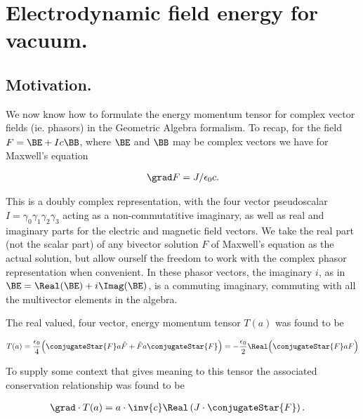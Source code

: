 

\chapter{Electrodynamic field energy for vacuum.}
\label{chap:fourierMaxVac}
{}
\date{Dec 16, 2009}

\beginArtWithToc

\section{Motivation.}

We now know how to formulate the energy momentum tensor for complex vector fields (ie. phasors) in the Geometric Algebra formalism.  To recap, for the field $F = \BE + I c \BB$, where $\BE$ and $\BB$ may be complex vectors we have for Maxwell's equation

\begin{align}\label{eqn:fourierMaxVac:1}
\grad F = J/\epsilon_0 c.
\end{align}

This is a doubly complex representation, with the four vector pseudoscalar $I = \gamma_0 \gamma_1 \gamma_2 \gamma_3$ acting as a non-commutatitive imaginary, as well as real and imaginary parts for the electric and magnetic field vectors.  We take the real part (not the scalar part) of any bivector solution $F$ of Maxwell's equation as the actual solution, but allow ourself the freedom to work with the complex phasor representation when convenient.  In these phasor vectors, the imaginary $i$, as in $\BE = \Real(\BE) + i \Imag(\BE)$, is a commuting imaginary, commuting with all the multivector elements in the algebra.

The real valued, four vector, energy momentum tensor $T(a)$ was found to be

\begin{align}\label{eqn:fourierMaxVac:2}
T(a) = \frac{\epsilon_0}{4} \Bigl( \conjugateStar{F} a \tilde{F} + \tilde{F} a \conjugateStar{F} \Bigr) = 
-\frac{\epsilon_0}{2} \Real \Bigl( \conjugateStar{F} a F \Bigr)  
\end{align}

To supply some context that gives meaning to this tensor the associated conservation relationship was found to be

\begin{align}\label{eqn:fourierMaxVac:3}
\grad \cdot T(a) &= a \cdot \inv{ c } \Real \left( J \cdot \conjugateStar{F} \right).
\end{align}


